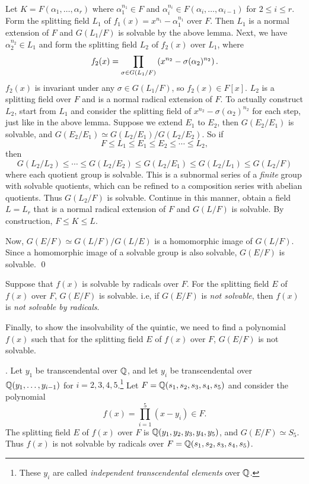 \pf Let \(K = F(\alpha_1, \dots, \alpha_r)\) where \(\alpha_1^{n_1} \in F\) and \(\alpha_i^{n_i} \in F(\alpha_i, \dots, \alpha_{i-1})\) for \(2 \leq i \leq r\). Form the splitting field \(L_1\) of \(f_1(x) = x^{n_1} - \alpha_1^{n_1}\) over \(F\). Then \(L_1\) is a normal extension of \(F\) and \(G(L_1/F)\) is solvable by the above lemma. Next, we have \(\alpha_2^{n_2} \in L_1\) and form the splitting field \(L_2\) of \(f_2(x)\) over \(L_1\), where
\[
    f_2(x) = \prod_{\sigma \in G(L_1/F)} \left( x^{n_2} - \sigma(\alpha_2)^{n_2} \right).
\]
\(f_2(x)\) is invariant under any \(\sigma \in G(L_1/F)\), so \(f_2(x) \in F[x]\). \(L_2\) is a splitting field over \(F\) and is a normal radical extension of \(F\). To actually construct \(L_2\), start from \(L_1\) and consider the splitting field of \(x^{n_2} - \sigma(\alpha_2)^{n_2}\) for each step, just like in the above lemma. Suppose we extend \(E_1\) to \(E_2\), then \(G(E_2/E_1)\) is solvable, and \(G(E_2/E_1) \simeq G(L_2/E_1) / G(L_2/E_2)\). So if
\[
    F \leq L_1 \leq E_1 \leq E_2 \leq \cdots \leq L_2,
\]
then
\[
    G(L_2/L_2) \leq \cdots \leq G(L_2/E_2) \leq G(L_2/E_1) \leq G(L_2/L_1) \leq G(L_2/F)
\]
where each quotient group is solvable. This is a subnormal series of a \textit{finite} group with solvable quotients, which can be refined to a composition series with abelian quotients. Thus \(G(L_2/F)\) is solvable. Continue in this manner, obtain a field \(L = L_r\) that is a normal radical extension of \(F\) and \(G(L/F)\) is solvable. By construction, \(F \leq K \leq L\).

Now, \(G(E/F) \simeq G(L/F) / G(L/E)\) is a homomorphic image of \(G(L/F)\). Since a homomorphic image of a solvable group is also solvable, \(G(E/F)\) is solvable. \qed

\rmk Suppose that \(f(x)\) is solvable by radicals over \(F\). For the splitting field \(E\) of \(f(x)\) over \(F\), \(G(E/F)\) is solvable. i.e, if \(G(E/F)\) is \textit{not solvable}, then \(f(x)\) is \textit{not solvable by radicals}.

Finally, to show the insolvability of the quintic, we need to find a polynomial \(f(x)\) such that for the splitting field \(E\) of \(f(x)\) over \(F\), \(G(E/F)\) is not solvable.

\pagebreak

\thm. Let \(y_1\) be transcendental over \(\mathbb{Q}\), and let \(y_i\) be transcendental over \(\mathbb{Q}(y_1, \dots, y_{i-1})\) for \(i = 2, 3, 4, 5\).\footnote{These \(y_i\) are called \textit{independent transcendental elements} over \(\mathbb{Q}\).} Let \(F = \mathbb{Q}(s_1, s_2, s_3, s_4, s_5)\) and consider the polynomial
\[
    f(x) = \prod_{i=1}^5 (x - y_i) \in F.
\]
The splitting field \(E\) of \(f(x)\) over \(F\) is \(\mathbb{Q}(y_1, y_2, y_3, y_4, y_5)\), and \(G(E/F) \simeq S_5\). Thus \(f(x)\) is not solvable by radicals over \(F = \mathbb{Q}(s_1, s_2, s_3, s_4, s_5)\).

